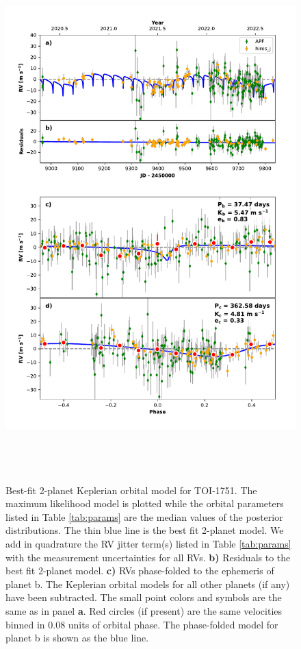 \documentclass{emulateapj}
\begin{document}
\begin{figure}[!h]
\centering 

\includegraphics[height=8.0in,width=6.0in,keepaspectratio]{TOI-1751_default_rv_multipanel.pdf}
\caption{ Best-fit 2-planet Keplerian orbital model
  for TOI-1751. The maximum likelihood model is plotted while
  the orbital parameters listed in Table \ref{tab:params} are the
  median values of the posterior distributions.  The thin blue line is
  the best fit 2-planet model. We add in quadrature
  the RV jitter term(s) listed in Table \ref{tab:params} with the
  measurement uncertainties for all RVs.  {\bf b)} Residuals to the
  best fit 2-planet model. {\bf c)} RVs phase-folded
  to the ephemeris of planet b. The Keplerian orbital models for all
  other planets (if any) have been subtracted.  The small point colors
  and symbols are the same as in panel {\bf a}.  Red circles (if
  present) are the same velocities binned in 0.08 units of orbital
  phase.  The phase-folded model for planet b is shown as the blue
  line.}
\end{figure}
 
\end{document}
